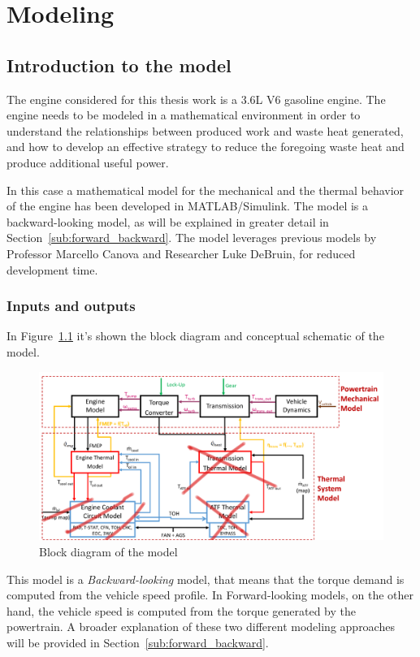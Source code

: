 \chapter{Modeling}

\section{Introduction to the model} 
 
The engine considered for this thesis work is a 3.6L V6 gasoline engine. The engine needs to be modeled in a mathematical environment in order to understand the relationships between produced work and waste heat generated, and how to develop an effective strategy to reduce the foregoing waste heat and produce additional useful power.

In this case a mathematical model for the mechanical and the thermal behavior of the engine has been developed in MATLAB/Simulink. The model is a backward-looking model, as will be explained in greater detail in Section~\ref{sub:forward_backward}. The model leverages previous models by Professor Marcello Canova and Researcher Luke DeBruin, for reduced development time.
 
\subsection{Inputs and outputs}

In Figure~\ref{fig:model_block_diagram} it's shown the block diagram and conceptual schematic of the model.

\begin{figure}[ht]
  \centering
  \includegraphics[width=\textwidth]{figures/model/block_diagram.pdf}
  \caption{Block diagram of the model\label{fig:model_block_diagram} }
\end{figure}

This model is a \emph{Backward-looking} model, that means that the torque demand is computed from the vehicle speed profile. In Forward-looking models, on the other hand, the vehicle speed is computed from the torque generated by the powertrain. A broader explanation of these two different modeling approaches will be provided in Section~\ref{sub:forward_backward}.
 
